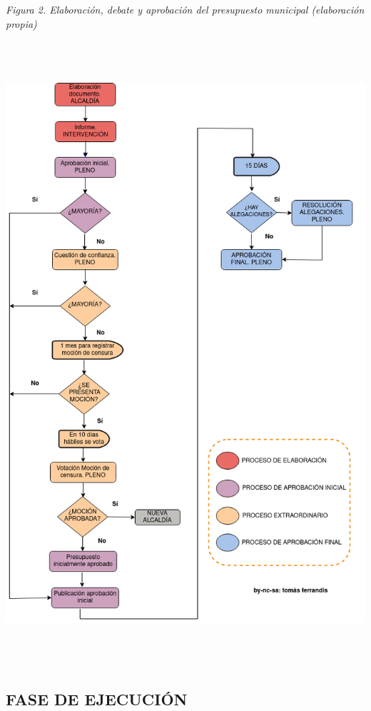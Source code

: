 \documentclass[
]{article}
\begin{document}
\emph{Figura 2. Elaboración, debate y aprobación del presupuesto
municipal (elaboración propia)}

\includegraphics[width=5.90069in,height=9.10347in]{./png/aprovacionpresupuestolocal.png}

\hypertarget{fase-de-ejecuciuxf3n}{%
\subsection{FASE DE EJECUCIÓN}\label{fase-de-ejecuciuxf3n}}
\end{document}
